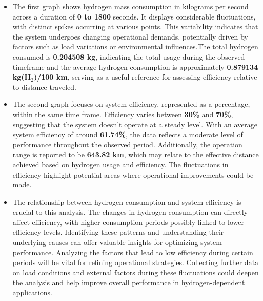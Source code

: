 \documentclass[12pt,a4paper]{article}
\numberwithin{equation}{section}
\begin{document}
\begin{itemize}
	\item The first graph shows hydrogen mass consumption in kilograms per second across a duration of \textbf{0 to 1800} seconds. It displays considerable fluctuations, with distinct spikes occurring at various points. This variability indicates that the system undergoes changing operational demands, potentially driven by factors such as load variations or environmental influences.The total hydrogen consumed is \textbf{0.204508 kg}, indicating the total usage during the observed timeframe and the average hydrogen consumption is approximately \textbf{0.879134 kg(H$_2$)/100 km}, serving as a useful reference for assessing efficiency relative to distance traveled. 
	
	\item The second graph focuses on system efficiency, represented as a percentage, within the same time frame. Efficiency varies between \textbf{30\%} and \textbf{70\%}, suggesting that the system doesn't operate at a steady level. With an average system efficiency of around \textbf{61.74\%}, the data reflects a moderate level of performance throughout the observed period. Additionally, the operation range is reported to be \textbf{643.82 km}, which may relate to the effective distance achieved based on hydrogen usage and efficiency. The fluctuations in efficiency highlight potential areas where operational improvements could be made.
	\item The relationship between hydrogen consumption and system efficiency is crucial to this analysis. The changes in hydrogen consumption can directly affect efficiency, with higher consumption periods possibly linked to lower efficiency levels. Identifying these patterns and understanding their underlying causes can offer valuable insights for optimizing system performance. Analyzing the factors that lead to low efficiency during certain periods will be vital for refining operational strategies. Collecting further data on load conditions and external factors during these fluctuations could deepen the analysis and help improve overall performance in hydrogen-dependent applications.
\end{itemize}




\end{document}
